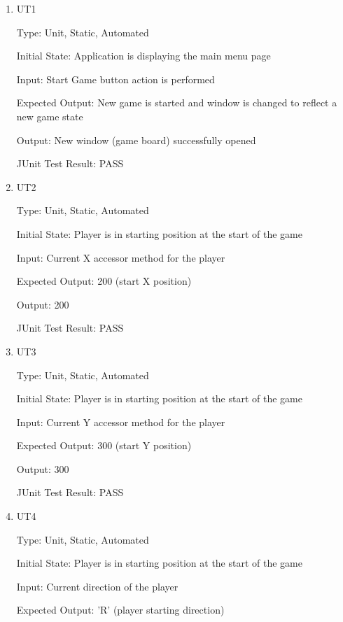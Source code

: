 \documentclass[12pt, titlepage]{article}
\begin{document}
\begin{enumerate}

\item{\label{ut1}{UT1}\\}

Type: Unit, Static, Automated
					
Initial State: Application is displaying the main menu page
					
Input: Start Game button action is performed
					
Expected Output: New game is started and window is changed to reflect a new game state
					
Output: New window (game board) successfully opened

JUnit Test Result: PASS

\item{\label{ut2}{UT2}\\}

Type: Unit, Static, Automated
					
Initial State: Player is in starting position at the start of the game
					
Input: Current X accessor method for the player
					
Expected Output: 200 (start X position)
					
Output: 200

JUnit Test Result: PASS

\item{\label{ut3}{UT3}\\}

Type: Unit, Static, Automated
					
Initial State: Player is in starting position at the start of the game
					
Input: Current Y accessor method for the player
					
Expected Output: 300 (start Y position)
					
Output: 300

JUnit Test Result: PASS

\item{\label{ut4}{UT4}\\}

Type: Unit, Static, Automated
					
Initial State: Player is in starting position at the start of the game
					
Input: Current direction of the player
					
Expected Output: 'R' (player starting direction)
					

\end{enumerate}
\end{document}
